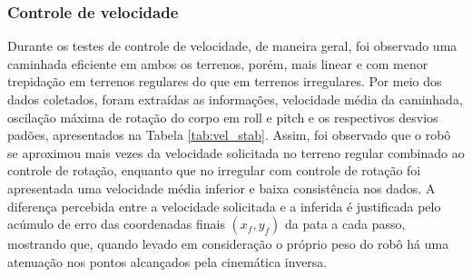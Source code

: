 \documentclass[../main.tex]{subfiles}
\begin{document}
  \subsubsection{Controle de velocidade}
  Durante os testes de controle de velocidade, de maneira geral, foi observado uma caminhada eficiente em ambos os terrenos, porém, mais linear e com menor trepidação em terrenos regulares do que em terrenos irregulares. Por meio dos dados coletados, foram extraídas as informações, velocidade média da caminhada, oscilação máxima de rotação do corpo em roll e pitch e os respectivos desvios padões, apresentados na Tabela \ref{tab:vel_stab}. Assim, foi observado que o robô se aproximou mais vezes da velocidade solicitada no terreno regular combinado ao controle de rotação, enquanto que no irregular com controle de rotação foi apresentada uma velocidade média inferior e baixa consistência nos dados. A diferença percebida entre a velocidade solicitada e a inferida é justificada pelo acúmulo de erro 
  das coordenadas finais $(x_f, y_f)$ da pata a cada passo, mostrando que, quando levado em consideração o próprio peso do robô há uma atenuação nos pontos alcançados pela cinemática inversa.
\end{document}
